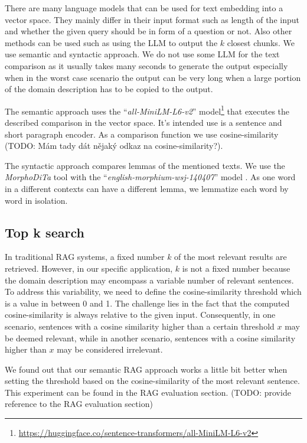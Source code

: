 There are many language models that can be used for text embedding into a vector space. They mainly differ in their input format such as length of the input and whether the given query should be in form of a question or not. Also other methods can be used such as using the LLM to output the $k$ closest chunks. We use semantic and syntactic approach. We do not use some LLM for the text comparison as it usually takes many seconds to generate the output especially when in the worst case scenario the output can be very long when a large portion of the domain description has to be copied to the output.

The semantic approach uses the ``\textit{all-MiniLM-L6-v2}'' model\footnote{\url{https://huggingface.co/sentence-transformers/all-MiniLM-L6-v2}} that executes the described comparison in the vector space. It's intended use is a sentence and short paragraph encoder. As a comparison function we use cosine-similarity (TODO: Mám tady dát nějaký odkaz na cosine-similarity?).

The syntactic approach compares lemmas of the mentioned texts. We use the \textit{MorphoDiTa} tool \cite{Strakova2014} with the ``\textit{english-morphium-wsj-140407}'' model \cite{Straka2014}. As one word in a different contexts can have a different lemma, we lemmatize each word by word in isolation.


\subsection{Top k search}

In traditional RAG systems, a fixed number $k$ of the most relevant results are retrieved. However, in our specific application, $k$ is not a fixed number because the domain description may encompass a variable number of relevant sentences. To address this variability, we need to define the cosine-similarity threshold which is a value in between 0 and 1. The challenge lies in the fact that the computed cosine-similarity is always relative to the given input. Consequently, in one scenario, sentences with a cosine similarity higher than a certain threshold $x$ may be deemed relevant, while in another scenario, sentences with a cosine similarity higher than $x$ may be considered irrelevant.

We found out that our semantic RAG approach works a little bit better when setting the threshold based on the cosine-similarity of the most relevant sentence. This experiment can be found in the RAG evaluation section. (TODO: provide reference to the RAG evaluation section)


